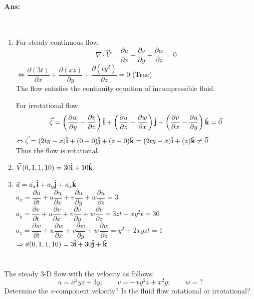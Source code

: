\paragraph{Ans:}$  $
\begin{enumerate}
	\item For steady continuous flow:
	\[\nabla \cdot \vec{V}=\dfrac{\partial u}{\partial x} + \dfrac{\partial v}{\partial y} + \dfrac{\partial w}{\partial z}=0\]
	$ \Leftrightarrow \dfrac{\partial (3t)}{\partial x} + \dfrac{\partial (xz)}{\partial y} + \dfrac{\partial (ty^2)}{\partial z} =0$ (True)\\
	The flow satisfies the continuity equation of incompressible fluid.
	
	For irrotational flow:
	 \[\vec{\zeta} = \left(\dfrac{\partial w}{\partial y} - \dfrac{\partial v}{\partial z}\right) \hat{\mathbf{i}} + \left(\dfrac{\partial u}{\partial z} - \dfrac{\partial w}{\partial x}\right) \hat{\mathbf{j}} + \left(\dfrac{\partial v}{\partial x} - \dfrac{\partial u}{\partial y}\right) \hat{\mathbf{k}} =\vec{0}\]
	$ \Leftrightarrow \vec{\zeta}= (2ty-x)\hat{\mathbf{i}} + (0-0)\hat{\mathbf{j}} + (z-0)\hat{\mathbf{k}} = (2ty-x)\hat{\mathbf{i}} + (z)\hat{\mathbf{k}} \neq \vec{0}$\\
	Thus the flow is rotational.
	\item $ \vec{V}(0,1,1,10) = 30\hat{\mathbf{i}} + 10\hat{\mathbf{k}} $
	\item $ \vec{a}=a_x\hat{\mathbf{i}}+a_y\hat{\mathbf{j}}+a_z\hat{\mathbf{k}} $\\
	$ a_x =  \dfrac{\partial u}{\partial t} +u \dfrac{\partial u}{\partial x} + v \dfrac{\partial u}{\partial y} + w \dfrac{\partial u}{\partial z} = 3$\\
	$ a_y =  \dfrac{\partial v}{\partial t} +u \dfrac{\partial v}{\partial x} + v \dfrac{\partial v}{\partial y} + w \dfrac{\partial v}{\partial z} = 3zt + xy^2t = 30$\\
	$ a_z =  \dfrac{\partial w}{\partial t} +u \dfrac{\partial w}{\partial x} + v \dfrac{\partial w}{\partial y} + w \dfrac{\partial w}{\partial z} = y^2 + 2xyzt = 1$\\
	$ \Rightarrow \vec{a}(0,1,1,10) = 3\hat{\mathbf{i}} + 30\hat{\mathbf{j}} + \hat{\mathbf{k}} $
\end{enumerate}
\section{}
The steady 3-D flow with the velocity as follows:
\[u=x^2yz+3y;\qquad v =-xy^2z+x^2y; \qquad w= ?\]
Determine the $ z $-component velocity? Is the fluid flow rotational or irrotational?
